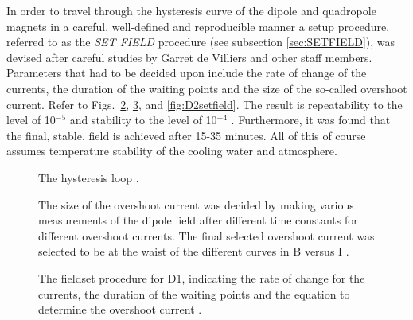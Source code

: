 \documentclass[11pt]{report}
\begin{document}
In order to travel through the hysteresis curve of the dipole and quadropole 
magnets in a careful, well-defined and reproducible manner a setup procedure, referred to as
the {\it SET FIELD} procedure (see subsection \ref{sec:SETFIELD}), was devised 
after careful studies by Garret de Villiers and other staff members.
Parameters that had to be decided upon include the rate of change of the currents, the duration
of the waiting points and the size of the so-called overshoot current.
Refer to Figs.~\ref{fig:overshootcurrent},
\ref{fig:D1setfield}, and
\ref{fig:D2setfield}.
The result is repeatability to the level of 10$^{-5}$ and stability to the level of 10$^{-4}$ \cite{Gar10}.
Furthermore, it was found that the final, stable, field is achieved after 15-35 minutes. All of this of course
assumes temperature stability of the cooling water and atmosphere.



\begin{figure}[!ht]
\centerline{\vspace{0cm}\hspace{0cm}
}
\centering
\caption{The hysteresis loop \cite{web10}.}
\label{fig:hysteresis}
\end{figure} 


\begin{figure}[!ht]
\centerline{\vspace{0cm}\hspace{0cm}
}
\centering
\caption{The size of the overshoot current was decided by making various measurements of the
dipole field after different time constants for different overshoot currents. The final selected overshoot
current was selected to be at the waist of the different curves in B versus I \cite{Gar10}.}
\label{fig:overshootcurrent}
\end{figure} 

\begin{figure}[!ht]
\centerline{\vspace{0cm}\hspace{0cm}
}
\centering
\caption{The fieldset procedure for D1, indicating the rate of change for the currents, the duration 
of the waiting points and the equation to determine the overshoot current \cite{Gar10}.}
\label{fig:D1setfield}
\end{figure} 
\end{document}
